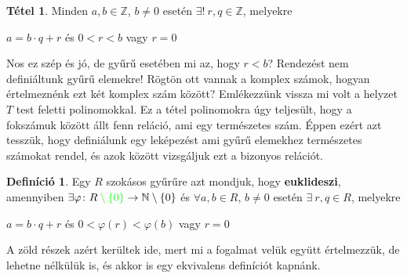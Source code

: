 \documentclass[12pt]{book}
\theoremstyle{plain} %
\theoremstyle{definition} %
\newtheorem{defi/}{Definíció}[section]
\newenvironment{defi}
  {\renewcommand{\qedsymbol}{$\clubsuit$}%
   \pushQED{\qed}\begin{defi/}}
  {\popQED\end{defi/}}
\newtheorem{theo/}{Tétel}[section]
\newenvironment{theo}
  {\renewcommand{\qedsymbol}{$\clubsuit$}%
   \pushQED{\qed}\begin{theo/}}
  {\popQED\end{theo/}}
\theoremstyle{remark}
\renewcommand\qedsymbol{$\blacksquare$}
\numberwithin{equation}{section}  %
\begin{document}
	\begin{theo}
		Minden $a,b\in \mathbb{Z}$, $b\neq 0$ esetén $\exists!\ r,q\in \mathbb{Z}$, melyekre
		\begin{center}
			$a=b\cdot q +r$ \hspace{2cm} és \hspace{2cm} $0<r<b$ \hspace{0.5cm} vagy \hspace{0.5cm} $r=0$
		\end{center}
	\end{theo}
	Nos ez szép és jó, de gyűrű esetében mi az, hogy $r<b$? Rendezést nem definiáltunk gyűrű elemekre! Rögtön ott vannak a komplex számok, hogyan értelmeznénk ezt két komplex szám között? Emlékezzünk vissza mi volt a helyzet $T$ test feletti polinomokkal. Ez a tétel polinomokra úgy teljesült, hogy a fokszámuk között állt fenn reláció, ami egy természetes szám. Éppen ezért azt tesszük, hogy definiálunk egy leképezést ami gyűrű elemekhez természetes számokat rendel, és azok között vizsgáljuk ezt a bizonyos relációt.
	\begin{defi}\label{euklgy}
		Egy $R$ szokásos gyűrűre azt mondjuk, hogy \textbf{euklideszi}, amennyiben \newline $\exists \varphi\colon R\color{green}\setminus \{0\}\color{black} \to \mathbb{N}\setminus \{0\}$ és $\forall a,b\in R$, $b\neq 0$ esetén $\exists\ r,q\in R$, melyekre
		\begin{center}
			$a=b\cdot q +r$ \hspace{1cm} és \hspace{1cm} $0<\varphi(r)<\varphi(b)$ \hspace{0.25cm} vagy \color{green}\hspace{0.25cm} $r=0$
		\end{center}
	\end{defi}
	A zöld részek azért kerültek ide, mert mi a fogalmat velük együtt értelmezzük, de lehetne nélkülük is, és akkor is egy ekvivalens definíciót kapnánk.
	
\end{document}
